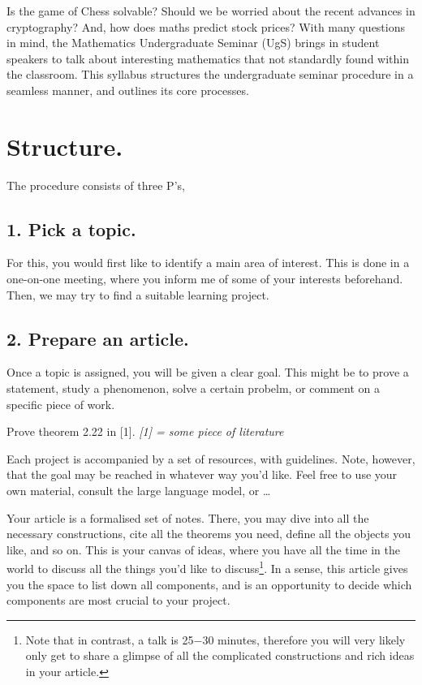 \documentclass[12pt]{article}
\begin{document}

\begin{smjsyllabusabstract}
Is the game of Chess solvable? Should we be worried about the recent advances in cryptography? And, how does maths predict stock prices? With many questions in mind, the Mathematics Undergraduate Seminar (UgS) brings in student speakers to talk about interesting mathematics that not standardly found within the classroom. This syllabus structures the undergraduate seminar procedure in a seamless manner, and outlines its core processes.
\end{smjsyllabusabstract}
%

\section{Structure.} The \UgS procedure consists of three P's,

\subsection{1. Pick a topic.} For this, you would first like to identify a main area of interest. This is done in a one-on-one meeting, where you inform me of some of your interests beforehand. Then, we may try to find a suitable learning project.

\subsection{2. Prepare an article.}
Once a topic is assigned, you will be given a clear goal. This might be to prove a statement, study a phenomenon, solve a certain probelm, or comment on a specific piece of work.

\begin{example}
     Prove theorem 2.22 in [1]. \hfill \emph{[1] = some piece of literature}
\end{example}

\noindent
Each project is accompanied by a set of resources, with guidelines. Note, however, that the goal may be reached in whatever way you'd like. Feel free to use your own material, consult the large language model, or \dots

\noindent
Your article is a formalised set of notes. There, you may dive into all the necessary constructions, cite all the theorems you need, define all the objects you like, and so on. This is your canvas of ideas, where you have all the time in the world to discuss all the things you'd like to discuss\footnote{Note that in contrast, a talk is 25$-$30 minutes, therefore you will very likely only get to share a glimpse of all the complicated constructions and rich ideas in your article.}. In a sense, this article gives you the space to list down all components, and is an opportunity to decide which components are most crucial to your project.
\end{document}
